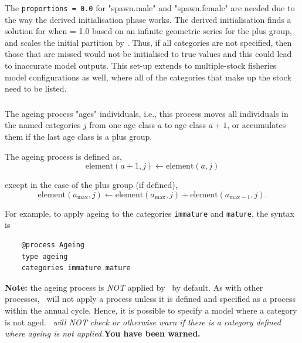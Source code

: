 	
The \texttt{proportions = 0.0} for "spawn.male" and "spawn.female" are needed due to the way the derived initialisation phase works. The derived initialisation finds a solution for when  = 1.0 based on an infinite geometric series for the plus group, and scales the initial partition by . Thus, if all categories are not specified, then those that are missed would not be initialised to true values and this could lead to inaccurate model outputs. This set-up extends to multiple-stock fisheries model configurations as well, where all of the categories that make up the stock need to be listed.

\subsubsection{\label{sec:ageing}}

The ageing process "ages" individuals, i.e., this process moves all individuals in the named categories $j$ from one age class $a$ to age class $a + 1$, or accumulates them if the last age class is a plus group.

The ageing process is defined as,
\begin{equation}
  \text{element}(a + 1,j) \leftarrow \text{element}(a,j)
\end{equation}

except in the case of the plus group (if defined),
\begin{equation}
  \text{element}(a_{\text{max}}, j) \leftarrow \text{element}(a_{\text{max}}, j) + \text{element}(a_{\text{max}-1}, j).
\end{equation}

For example, to apply ageing to the categories \texttt{immature} and \texttt{mature}, the syntax is

{\small{\begin{verbatim}
	@process Ageing
	type ageing
	categories immature mature
	\end{verbatim}}}

\textbf{Note:} the ageing process is \emph{NOT} applied by \CNAME~by default. As with other processes, \CNAME~will not apply a process unless it is defined and specified as a process within the annual cycle. Hence, it is possible to specify a model where a category is not aged. \emph{\CNAME~will NOT check or otherwise warn if there is a category defined where ageing is not applied.}\textbf{You have been warned.}

\subsubsection{\label{sec:mortality}}

